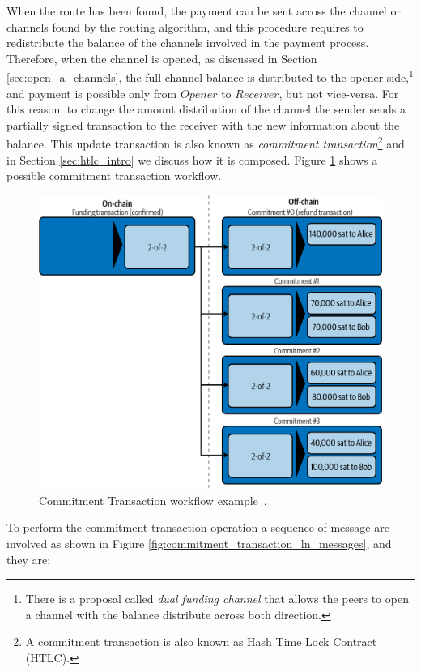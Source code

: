 When the route has been found, the payment can be sent across the channel or channels found by the routing algorithm, and this procedure
requires to redistribute the balance of the channels involved in the payment process.\\
Therefore, when the channel is opened, as discussed in Section \ref{sec:open_a_channels}, the full channel balance
is distributed to the opener side,\footnote{There is a proposal called \emph{dual funding channel} that allows the peers to open a channel with the balance distribute across both direction.}
and payment is possible only from $Opener$ to $Receiver$, but not vice-versa. For this reason, to change the amount distribution
of the channel the sender sends a partially signed transaction to the receiver with the new information about the balance.
This update transaction is also known as \emph{commitment transaction}\footnote{A commitment transaction is also known as Hash Time Lock Contract (HTLC).} and in Section \ref{sec:htlc_intro} we discuss how it is composed.
Figure \ref{fig:commitment_transaction_example} shows a possible commitment transaction workflow.

\begin{figure}[h]
  \begin{center}
  \includegraphics[width=0.6\columnwidth]{imgs/mtln_0706.png}
  \end{center}
    \caption{Commitment Transaction workflow example~\cite{lnbook}.}
  \label{fig:commitment_transaction_example}
\end{figure}


To perform the commitment transaction operation a sequence of {\LN} message are involved as shown in Figure \ref{fig:commitment_transaction_ln_messages}, and they are:

